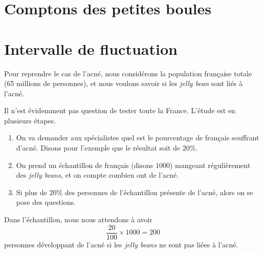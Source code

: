 


\section{Comptons des petites boules}




\section{Intervalle de fluctuation}

Pour reprendre le cas de l'acné, nous considérons la population française totale (65 millions de personnes), et nous voulons savoir si les \emph{jelly bean} sont liés à l'acné.

Il n'est évidemment pas question de tester toute la France. L'étude est en plusieurs étapes.
\begin{enumerate}
    \item
        On va demander aux spécialistes quel est le pourcentage de français souffrant d'acné. Disons pour l'exemple que le résultat soit de \( 20\%\).
    \item
        On prend un échantillon de français (disons \( 1000\)) mangeant régulièrement des \emph{jelly beans}, et on compte combien ont de l'acné.
    \item
        Si plus de \( 20\%\) des personnes de l'échantillon présente de l'acné, alors on se pose des questions.
\end{enumerate}

Dans l'échantillon, nous nous attendons à avoir 
\begin{equation}
    \frac{ 20 }{ 100 }\times 1000=200
\end{equation}
personnes développant de l'acné si les \emph{jelly beans} ne sont pas liées à l'acné. 

